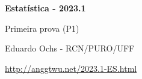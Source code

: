\documentclass[oneside,12pt]{article}
\begin{document}
\pu

\def\minibalas#1{{
  \unitlength=5pt
  \setdotdims{0.5}{0.2}
  \scalebox{0.7}{$
    \ga{#1}
  $}}}
\def\MBA#1#2#3{#1 \; ⇒ \; \minibalas{#2}}
\def\MBB#1#2#3{P(#1) = #3}
\def\MBC#1#2#3{\begin{array}{rcl}
   #1\phantom{i} &⇒& \minibalas{#2} \\[-2pt]
  P(#1) &=& #3 \\
  \end{array}}



%

\thispagestyle{empty}

\begin{center}

\vspace*{1.2cm}

{\bf \Large Estatística - 2023.1}

\bsk

Primeira prova (P1)

\bsk

Eduardo Ochs - RCN/PURO/UFF

\url{http://anggtwu.net/2023.1-ES.html}

\end{center}
\end{document}
